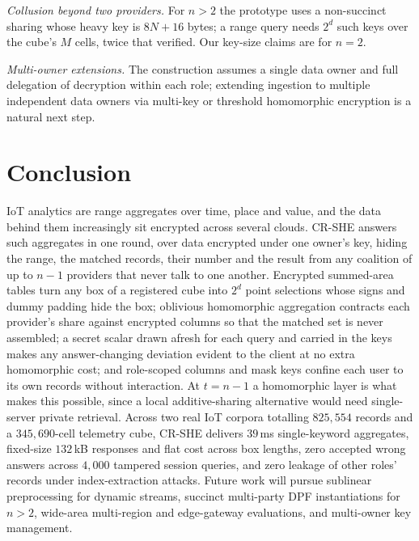 \documentclass[a4paper,fleqn]{cas-sc}
\newif\ifanonymous
\begin{document}
\emph{Collusion beyond two providers.} For $n>2$ the prototype uses a
non-succinct sharing whose heavy key is $8N+16$ bytes; a range query needs
$2^d$ such keys over the cube's $M$ cells, twice that verified. Our key-size
claims are for $n=2$.

\emph{Multi-owner extensions.} The construction assumes a single data owner
and full delegation of decryption within each role; extending ingestion to
multiple independent data owners via multi-key or threshold homomorphic
encryption is a natural next step.

\section{Conclusion}
\label{sec:conclusion}

IoT analytics are range aggregates over time, place and value, and the data
behind them increasingly sit encrypted across several clouds. CR-SHE answers
such aggregates in one round, over data encrypted under one owner's key,
hiding the range, the matched records, their number and the result from any
coalition of up to $n-1$ providers that never talk to one another. Encrypted
summed-area tables turn any box of a registered cube into $2^d$ point
selections whose signs and dummy padding hide the box; oblivious homomorphic
aggregation contracts each provider's share against encrypted columns so that
the matched set is never assembled; a secret scalar drawn afresh for each query
and carried in the keys makes any answer-changing deviation evident to the
client at no extra homomorphic cost; and role-scoped columns and mask keys
confine each user to its own records without interaction. At $t=n-1$ a
homomorphic layer is what makes this possible, since a local additive-sharing
alternative would need single-server private retrieval. Across two real IoT corpora totalling $825{,}554$ records and a
$345{,}690$-cell telemetry cube, CR-SHE delivers $39$\,ms single-keyword
aggregates, fixed-size $132$\,kB responses and flat cost across box lengths,
zero accepted wrong answers across $4{,}000$ tampered session queries, and
zero leakage of other roles' records under index-extraction attacks.
Future work will pursue sublinear preprocessing for dynamic streams,
succinct multi-party DPF instantiations for $n>2$, wide-area multi-region and
edge-gateway evaluations, and multi-owner key management.

\ifanonymous\else\printcredits\fi
\end{document}
